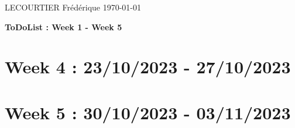 \documentclass{article}
\begin{document}
	LECOURTIER Frédérique \hfill \today
	\begin{center}
		\Large\textbf{{ToDoList : Week 1 - Week 5}}
	\end{center}
	\tableofcontents

	\newpage

	\section*{Week 4 : 23/10/2023 - 27/10/2023}

		

	\newpage

	\section*{Week 5 : 30/10/2023 - 03/11/2023}

		
\end{document}

